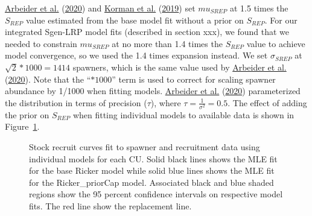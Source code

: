 \documentclass[11pt]{book}
\begin{document}
\protect\hyperlink{ref-arbeiderInteriorFraserCoho2020}{Arbeider et al.} (\protect\hyperlink{ref-arbeiderInteriorFraserCoho2020}{2020}) and \protect\hyperlink{ref-kormanEvaluationFrameworkAssessing2019}{Korman et al.} (\protect\hyperlink{ref-kormanEvaluationFrameworkAssessing2019}{2019}) set \(mu_{SREP}\) at 1.5 times the \(S_{REP}\) value estimated from the base model fit without a prior on \(S_{REP}\). For our integrated Sgen-LRP model fits (described in section xxx), we found that we needed to constrain \(mu_{SREP}\) at no more than 1.4 times the \(S_{REP}\) value to achieve model convergence, so we used the 1.4 times expansion instead. We set \(\sigma_{SREP}\) at \(\sqrt{2} * 1000 = 1414\) spawners, which is the same value used by \protect\hyperlink{ref-arbeiderInteriorFraserCoho2020}{Arbeider et al.} (\protect\hyperlink{ref-arbeiderInteriorFraserCoho2020}{2020}). Note that the ``\(* 1000\)'' term is used to correct for scaling spawner abundance by 1/1000 when fitting models. \protect\hyperlink{ref-arbeiderInteriorFraserCoho2020}{Arbeider et al.} (\protect\hyperlink{ref-arbeiderInteriorFraserCoho2020}{2020}) parameterized the distribution in terms of precision (\(\tau\)), where \(\tau = \frac{1}{\sigma^2} = 0.5\). The effect of adding the prior on \(S_{REP}\) when fitting individual models to available data is shown in Figure~\ref{fig:coho-SR-fit}.
\begin{figure}[htb]

{\centering {} 

}

\caption{Stock recruit curves fit to spawner and recruitment data using individual models for each CU. Solid black lines shows the MLE fit for the base Ricker model while solid blue lines shows the MLE fit for the Ricker\_priorCap model.  Associated black and blue shaded regions show the 95 percent confidence intervals on respective model fits. The red line show the replacement line.}\label{fig:coho-SR-fit}
\end{figure}
\end{document}
